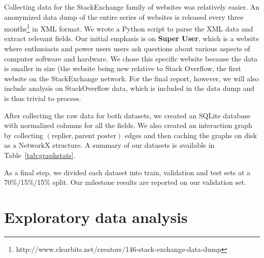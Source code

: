 \documentclass[10pt]{article}
\begin{document}
Collecting data for the StackExchange family of websites was relatively easier.
An anonymized data dump of the entire series of websites is released every three
months\footnote{http://www.clearbits.net/creators/146-stack-exchange-data-dump}
in XML format. We wrote a Python script to parse the XML data and extract
relevant fields. Our initial emphasis is on \textbf{Super User}, which is a website where
enthusiasts and power users users ask questions about various aspects of
computer software and hardware. We chose this specific website because the data
is smaller in size (the website being new relative to Stack Overflow, the first
website on the StackExchange network. For the final report, however, we will
also include analysis on StackOverflow data, which is included in the data dump
and is thus trivial to process.

After collecting the raw data for both datasets, we created an SQLite database
with normalized columns for all the fields. We also created an interaction graph
by collecting $(\text{replier}, \text{parent poster})$ edges and then caching
the graphs on disk as a NetworkX structure. A summary of our datasets is
available in Table~\ref{tab:graphstats}.

As a final step, we divided each dataset into train, validation and test sets at
a 70\%/15\%/15\% split. Our milestone results are reported on our validation
set.

\section{Exploratory data analysis}
\end{document}
